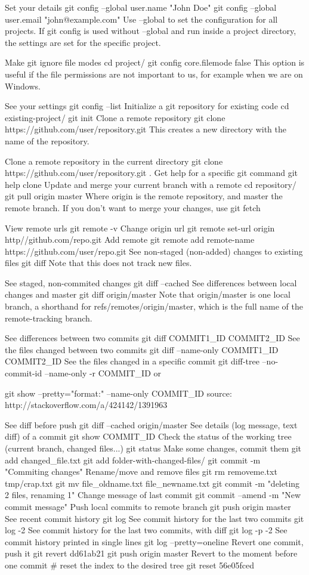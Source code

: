 
Set your details
git config --global user.name "John Doe"
git config --global user.email "john@example.com"
Use --global to set the configuration for all projects. If git config is used without --global and run inside a project directory, the settings are set for the specific project.

Make git ignore file modes
cd project/
git config core.filemode false
This option is useful if the file permissions are not important to us, for example when we are on Windows.

See your settings
git config --list
Initialize a git repository for existing code
cd existing-project/
git init
Clone a remote repository
git clone https://github.com/user/repository.git
This creates a new directory with the name of the repository.

Clone a remote repository in the current directory
git clone https://github.com/user/repository.git .
Get help for a specific git command
git help clone
Update and merge your current branch with a remote
cd repository/
git pull origin master
Where origin is the remote repository, and master the remote branch.
If you don't want to merge your changes, use git fetch

View remote urls
git remote -v
Change origin url
git remote set-url origin http//github.com/repo.git
Add remote
git remote add remote-name https://github.com/user/repo.git
See non-staged (non-added) changes to existing files
git diff
Note that this does not track new files.

See staged, non-commited changes
git diff --cached
See differences between local changes and master
git diff origin/master
Note that origin/master is one local branch, a shorthand for refs/remotes/origin/master, which is the full name of the remote-tracking branch.

See differences between two commits
git diff COMMIT1_ID COMMIT2_ID
See the files changed between two commits
git diff --name-only COMMIT1_ID COMMIT2_ID
See the files changed in a specific commit
git diff-tree --no-commit-id --name-only -r COMMIT_ID
or

git show --pretty="format:" --name-only COMMIT_ID
source: http://stackoverflow.com/a/424142/1391963

See diff before push
git diff --cached origin/master
See details (log message, text diff) of a commit
git show COMMIT_ID
Check the status of the working tree (current branch, changed files...)
git status
Make some changes, commit them
git add changed_file.txt
git add folder-with-changed-files/
git commit -m "Commiting changes"
Rename/move and remove files
git rm removeme.txt tmp/crap.txt
git mv file_oldname.txt file_newname.txt
git commit -m "deleting 2 files, renaming 1"
Change message of last commit
git commit --amend -m "New commit message"
Push local commits to remote branch
git push origin master
See recent commit history
git log
See commit history for the last two commits
git log -2
See commit history for the last two commits, with diff
git log -p -2
See commit history printed in single lines
git log --pretty=oneline
Revert one commit, push it
git revert dd61ab21
git push origin master
Revert to the moment before one commit
# reset the index to the desired tree
git reset 56e05fced

